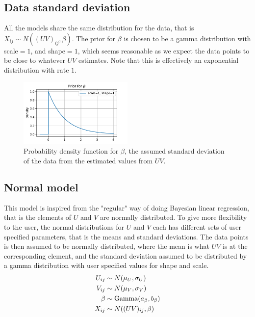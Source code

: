 \documentclass[12pt]{article}
\begin{document}
    \subsection*{Data standard deviation}
        All the models share the same distribution for the data, that is $X_{ij}\sim N((UV)_{ij}, \beta)$. The prior for $\beta$ is chosen to be a gamma distribution with scale$=1$, and shape$=1$, which seems reasonable as we expect the data points to be close to whatever $UV$ estimates. Note that this is effectively an exponential distribution with rate $1$.
    
        \begin{figure}[H]
            \centering
            \includegraphics[width=0.5\textwidth]{betaprior.pdf}
            \caption{Probability density function for $\beta$, the assumed standard deviation of the data from the estimated values from $UV$.}
        \end{figure}
    
    \subsection{Normal model}
    This model is inspired from the "regular" way of doing Bayesian linear regression, that is the elements of $U$ and $V$ are normally distributed. To give more flexibility to the user, the normal distributions for $U$ and $V$ each has different sets of user specified parameters, that is the means and standard deviations. The data points is then assumed to be normally distributed, where the mean is what $UV$ is at the corresponding element, and the standard deviation assumed to be distributed by a gamma distribution with user specified values for shape and scale.
    \begin{align*}
        U_{ij}  &\sim N(\mu_U, \sigma_U) \\
        V_{ij}  &\sim N(\mu_V, \sigma_V) \\
        \beta  &\sim \operatorname{Gamma}(a_\beta, b_\beta) \\
        X_{ij} &\sim N((UV)_{ij}, \beta) 
    \end{align*}
\end{document}
